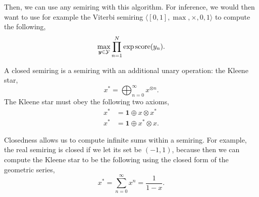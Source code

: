 Then, we can use any semiring with this algorithm. For inference, we would then
want to use for example the Viterbi semiring $\langle [0,1], \max, \times, 0, 1
\rangle$ to compute the following, \[
  \max_{\bm{y}\in\mathcal{Y}} \prod_{n=1}^N \exp \mathrm{score}(y_n)
.\]

\begin{definition}
  A closed semiring is a semiring with an additional unary operation: the
  Kleene star, \[
    x^* = \bigoplus_{n=0}^\infty x^{\otimes n}
  .\]
  The Kleene star must obey the following two axioms,
  \begin{align*}
    x^* &= \bm{1} \oplus x \otimes x^* \\
    x^* &= \bm{1} \oplus x^* \otimes x
  .\end{align*}
\end{definition}

Closedness allows us to compute infinite sums within a semiring. For example,
the real semiring is closed if we let its set be $(-1,1)$, because then we can
compute the Kleene star to be the following using the closed form of the
geometric series, \[
  x^* = \sum_{n=0}^\infty x^n = \frac{1}{1-x}
.\]
